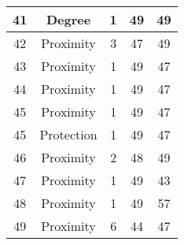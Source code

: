 \documentclass[results.tex]{subfiles}
\begin{document}
\begin{center}
\begin{tabular}{| c || c | c | c | c |}
    \hline
    41 & Degree & 1 & 49 & 49 \\ 
    \hline
    42 & Proximity & 3 & 47 & 49 \\ 
    \hline
    43 & Proximity & 1 & 49 & 47 \\ 
    \hline
    44 & Proximity & 1 & 49 & 47 \\ 
    \hline
    45 & Proximity & 1 & 49 & 47 \\ 
    \hline
    45 & Protection & 1 & 49 & 47 \\ 
    \hline
    46 & Proximity & 2 & 48 & 49 \\ 
    \hline
    47 & Proximity & 1 & 49 & 43 \\ 
    \hline
    48 & Proximity & 1 & 49 & 57 \\ 
    \hline
    49 & Proximity & 6 & 44 & 47 \\ 
    \hline   \end{tabular}
\end{center}
\end{document}
